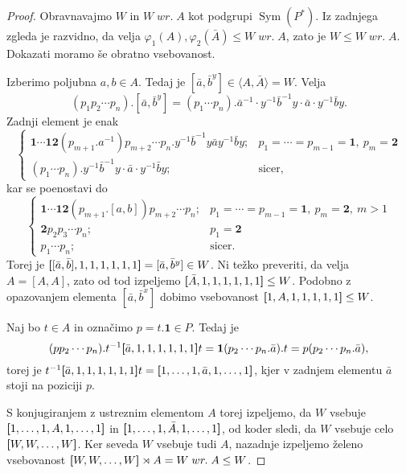 \documentclass[11pt]{book}
\renewcommand{\wreath}{\; wr. \;}
\def\one{\mathbf{1}}
\def\two{\mathbf{2}}
\DeclareMathOperator\Sym{Sym}
\theoremstyle{definition}
\theoremstyle{zgled}
\theoremstyle{odprtproblem}
\theoremstyle{domacanaloga}
\newenvironment{dokaz}
    {\color{siva}\begin{proof}}
    {\end{proof}}
\theoremstyle{izrek}
\begin{document}
\begin{dokaz}
Obravnavajmo $W$ in $W \wreath A$ kot podgrupi $\Sym(P^*)$. Iz zadnjega zgleda je razvidno, da velja $\varphi_1(A), \varphi_2(\bar A) \leq W \wreath A$, zato je $W \leq W \wreath A$. Dokazati moramo še obratno vsebovanost. 

Izberimo poljubna $a,b \in A$. Tedaj je $[\bar a, \bar b^y] \in \langle A, \bar A \rangle = W$. Velja
\[
(p_1p_2\cdots p_n).[\bar a, \bar b^y] = (p_1 \cdots p_n).\bar a^{-1} \cdot y^{-1} \bar b^{-1} y \cdot \bar a \cdot y^{-1} \bar b y.
\]
Zadnji element je enak
\[
\begin{cases}
\one \cdots \one \two (p_{m+1}.a^{-1})p_{m+2}\cdots p_n. y^{-1} \bar b^{-1} y \bar a y^{-1} \bar b y; & p_1 = \cdots = p_{m-1} = \one, \ p_m = \two \\
(p_1\cdots p_n).y^{-1} \bar b^{-1} y \cdot \bar a \cdot y^{-1} \bar b y; & \text{sicer,}
\end{cases}
\]
kar se poenostavi do
\[
\begin{cases}
\one \cdots \one \two (p_{m+1}.[a,b])p_{m+2}\cdots p_n; & p_1 = \cdots = p_{m-1} = \one, \ p_m = \two, \ m > 1 \\
\two p_2 p_3 \cdots p_n; & p_1 = \two \\
p_1\cdots p_n; & \text{sicer.}
\end{cases}
\]
Torej je ${\textbf [} [\bar a, \bar b], 1, 1, 1, 1, 1, 1 {\textbf ]} = [\bar a, \bar b^y] \in W$. Ni težko preveriti, da velja $A = [A,A]$, zato od tod izpeljemo ${\textbf [} \bar A, 1, 1, 1, 1, 1, 1 {\textbf ]} \leq W$. Podobno z opazovanjem elementa $[\bar a, \bar b^x]$ dobimo vsebovanost ${\textbf [} 1, A, 1, 1, 1, 1, 1 {\textbf ]} \leq W$.

Naj bo $t \in A$ in označimo $p = t.\one \in P$. Tedaj je
\[
(p p_2 \cdots p_n).t^{-1} {\textbf [} \bar a, 1, 1, 1, 1, 1, 1 {\textbf ]} t
= \one (p_2 \cdots p_n.\bar a).t
= p(p_2 \cdots p_n.\bar a), 
\]
torej je $t^{-1} {\textbf [} \bar a,  1, 1, 1, 1, 1, 1 {\textbf ]} t = {\textbf [} 1, \dots, 1, \bar a, 1, \dots, 1 {\textbf ]}$, kjer v zadnjem elementu $\bar a$ stoji na poziciji $p$.

S konjugiranjem z ustreznim elementom $A$ torej izpeljemo, da $W$ vsebuje ${\textbf [} 1, \dots, 1, A, 1, \dots, 1 {\textbf ]}$ in ${\textbf [} 1, \dots, 1, \bar A, 1, \dots, 1 {\textbf ]}$, od koder sledi, da $W$ vsebuje celo ${\textbf [} W, W, \dots, W {\textbf ]}$. Ker seveda $W$ vsebuje tudi $A$, nazadnje izpeljemo želeno vsebovanost ${\textbf [} W, W, \dots, W {\textbf ]} \rtimes A = W \wreath A \leq W$.
\end{dokaz}
\end{document}
